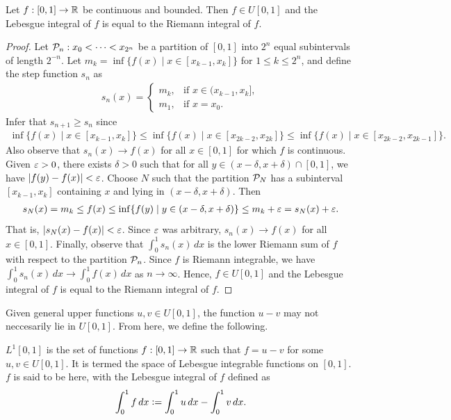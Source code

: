 \begin{theorem}
    Let $f:[0,1] \to \mathbb{R}$ be continuous and bounded. Then $f \in U[0,1]$ and the Lebesgue integral of $f$ is equal to the Riemann integral of $f$.
\end{theorem}
\begin{proof}
    Let $\mathcal{P}_{n}:x_{0} < \cdots < x_{2^{n}}$ be a partition of $[0,1]$ into $2^{n}$ equal subintervals of length $2^{-n}$. Let $m_{k} = \inf\{f(x) \mid x \in [x_{k-1},x_{k}]\}$ for $1 \leq k \leq 2^{n}$, and define the step function $s_{n}$ as
    \begin{align}
        s_{n}(x) = \begin{cases}
            m_{k}, & \text{if } x \in (x_{k-1},x_{k}], \\
            m_{1}, & \text{if } x = x_{0}.
        \end{cases}
    \end{align}
    Infer that $s_{n+1} \geq s_{n}$ since
    \begin{align}
        \inf\{f(x) \mid x \in [x_{k-1},x_{k}]\} \leq \inf\{f(x) \mid x \in [x_{2k-2},x_{2k}]\} \leq \inf\{f(x) \mid x \in [x_{2k-2},x_{2k-1}]\}.
    \end{align}
    Also observe that $s_{n}(x) \to f(x)$ for all $x \in [0,1]$ for which $f$ is continuous. Given $\varepsilon > 0$, there exists $\delta > 0$ such that for all $y \in (x-\delta,x+\delta) \cap [0,1]$, we have $\left| f(y)-f(x) \right| < \varepsilon$. Choose $N$ such that the partition $\mathcal{P}_{N}$ has a subinterval $[x_{k-1},x_{k}]$ containing $x$ and lying in $(x-\delta,x+\delta)$. Then
    \begin{align}
        s_{N}(x) = m_{k} \leq f(x) \leq \inf\{f(y) \mid y \in (x-\delta,x+\delta)\} \leq m_{k} + \varepsilon = s_{N}(x) + \varepsilon.
    \end{align}
    That is, $\left| s_{N}(x)-f(x) \right| < \varepsilon$. Since $\varepsilon$ was arbitrary, $s_{n}(x) \to f(x)$ for all $x \in [0,1]$. Finally, observe that $\int_{0}^{1} s_{n}(x) \, dx$ is the lower Riemann sum of $f$ with respect to the partition $\mathcal{P}_{n}$. Since $f$ is Riemann integrable, we have $\int_{0}^{1} s_{n}(x) \, dx \to \int_{0}^{1} f(x) \, dx$ as $n \to \infty$. Hence, $f \in U[0,1]$ and the Lebesgue integral of $f$ is equal to the Riemann integral of $f$.
\end{proof}

Given general upper functions $u,v \in U[0,1]$, the function $u-v$ may not neccesarily lie in $U[0,1]$. From here, we define the following.

\begin{definition}
    $L^{1}[0,1]$ is the set of functions $f:[0,1] \to \mathbb{R}$ such that $f = u-v$ for some $u,v \in U[0,1]$. It is termed the space of Lebesgue integrable functions on $[0,1]$. $f$ is said to be  here, with the Lebesgue integral of $f$ defined as
    \begin{align}
        \int_{0}^{1} f \, dx \vcentcolon= \int_{0}^{1} u \, dx - \int_{0}^{1} v \, dx.
    \end{align}
\end{definition}

